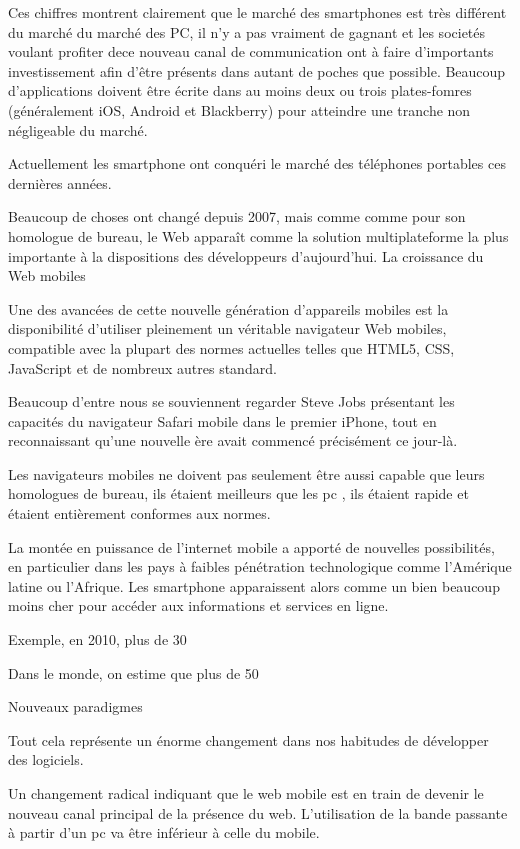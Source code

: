 Ces chiffres montrent clairement que le marché des smartphones est très différent du marché du marché des PC, il n’y a pas vraiment de gagnant et les societés voulant profiter dece nouveau canal de communication ont à faire d’importants investissement afin d’être présents dans autant de poches que possible. Beaucoup d’applications doivent être écrite dans au moins deux ou trois plates-fomres (généralement iOS, Android et Blackberry) pour atteindre une tranche non négligeable du marché.

Actuellement les smartphone ont conquéri le marché des téléphones portables ces dernières années.

Beaucoup de choses ont changé depuis 2007, mais comme comme pour son homologue de bureau, le Web apparaît comme la solution multiplateforme la plus importante à la dispositions des développeurs d’aujourd’hui.
La croissance du Web mobiles

Une des avancées de cette nouvelle génération d’appareils mobiles est la disponibilité d’utiliser pleinement un véritable navigateur Web mobiles, compatible avec la plupart des normes actuelles telles que HTML5, CSS, JavaScript et de nombreux autres standard.

Beaucoup d’entre nous se souviennent regarder Steve Jobs présentant les capacités du navigateur Safari mobile dans le premier iPhone, tout en reconnaissant qu’une nouvelle ère avait commencé précisément ce jour-là.

Les navigateurs mobiles ne doivent pas seulement être aussi capable que leurs homologues de bureau, ils étaient meilleurs que les pc , ils étaient rapide et étaient entièrement conformes aux normes.

La montée en puissance de l’internet mobile a apporté de nouvelles possibilités, en particulier dans les pays à faibles pénétration technologique comme l’Amérique latine ou l’Afrique. Les smartphone apparaissent alors comme un bien beaucoup moins cher pour accéder aux informations et services en ligne.

Exemple, en 2010, plus de 30%

Dans le monde, on estime que plus de 50%

Nouveaux paradigmes

Tout cela représente un énorme changement dans nos habitudes de développer des logiciels.

Un changement radical indiquant  que le web mobile est en train de devenir le nouveau canal principal de la présence du web. L’utilisation de la bande passante à partir d’un pc va être inférieur à celle du mobile.

